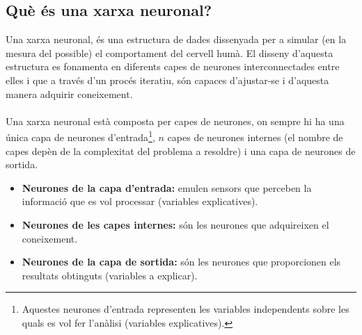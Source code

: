 \documentclass[12pt]{article}
\begin{document}
\subsection{Què és una xarxa neuronal?}
Una xarxa neuronal, és una estructura de dades dissenyada per a simular (en la mesura del possible) el comportament del cervell humà. El disseny d'aquesta estructura es fonamenta en diferents capes de neurones interconnectades entre elles i que a través d'un procés iteratiu, són capaces d'ajustar-se i d'aquesta manera adquirir coneixement.
\\\\Una xarxa neuronal està composta per capes de neurones, on sempre hi ha una única capa de neurones d'entrada\footnote{Aquestes neurones d'entrada representen les variables independents sobre les quals es vol fer l'anàlisi (variables explicatives).}, $n$ capes de neurones internes (el nombre de capes depèn de la complexitat del problema a resoldre) i una capa de neurones de sortida.
\begin{itemize}
	\item \textbf{Neurones de la capa d'entrada:} emulen sensors que perceben la informació que es vol processar (variables explicatives).
	\item \textbf{Neurones de les capes internes:} són les neurones que adquireixen el coneixement.
	\item \textbf{Neurones de la capa de sortida:} són les neurones que proporcionen els resultats obtinguts (variables a explicar).
\end{itemize}


\clearpage
\end{document}
